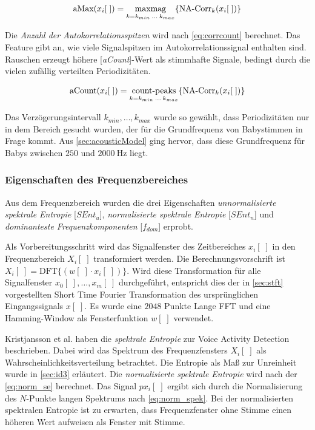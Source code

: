 \begin{equation}
\text{aMax}(x_i[\;]) = \operatorname*{max mag}_{k = k_{min} \: \ldots \: k_{max}}\{\text{NA-Corr}_k(x_i[\;])\}
\label{eq:corrpeak}
\end{equation}

Die \emph{Anzahl der Autokorrelationsspitzen} wird nach \autoref{eq:corrcount} berechnet. Das Feature gibt an, wie viele Signalspitzen im Autokorrelationssignal enthalten sind. Rauschen erzeugt höhere [\emph{aCount}]-Wert als stimmhafte Signale, bedingt durch die vielen zufällig verteilten Periodizitäten.\cite[S. 1 - 2]{vad_Lisboa}

\begin{equation}
\text{aCount}(x_i[\;]) = \operatorname*{count-peaks}_{k = k_{min} \: \ldots \: k_{max}}\{\text{NA-Corr}_k(x_i[\;])\}
\label{eq:corrcount}
\end{equation}

Das Verzögerungsintervall $k_{min} , \ldots , k_{max}$ wurde so gewählt, dass Periodizitäten nur in dem Bereich gesucht wurden, der für die Grundfrequenz von Babystimmen in Frage kommt. Aus \autoref{sec:acousticModel} ging hervor, dass diese Grundfrequenz für Babys zwischen $250$ und $\SI{2000}{\hertz}$ liegt.

\subsubsection{Eigenschaften des Frequenzbereiches}

Aus dem Frequenzbereich wurden die drei Eigenschaften \emph{unnormalisierte spektrale Entropie} [$SEnt_{u}$], \emph{normalisierte spektrale Entropie}  [$SEnt_{n}$] und \emph{dominanteste Frequenzkomponenten} [$f_{dom}$] erprobt.\cite{vad_Lisboa}

Als Vorbereitungsschritt wird das Signalfenster des Zeitbereiches $x_i[\;]$ in den Frequenzbereich $X_i[\;]$ transformiert werden. Die Berechnungsvorschrift ist $X_i[\;] = \text{DFT}\{(w[\;] \cdot x_i[\;])\}$. Wird diese Transformation für alle Signalfenster $x_0[\;], \ldots, x_m[\;]$ durchgeführt, entspricht dies der in \autoref{sec:stft} vorgestellten Short Time Fourier Transformation des ursprünglichen Eingangssignals $x[\;]$. Es wurde eine $2048$ Punkte Lange FFT und eine Hamming-Window als Fensterfunktion $w[\;]$ verwendet.

Kristjansson et al. \cite[S. 2]{vad_Lisboa} haben die \emph{spektrale Entropie} zur Voice Activity Detection beschrieben. Dabei wird das Spektrum des Frequenzfensters $X_i[\;]$ als Wahrscheinlichkeitsverteilung betrachtet. Die Entropie als Maß zur \glqq Unreinheit\grqq{} wurde in \autoref{sec:id3} erläutert. Die \emph{normalisierte spektrale Entropie} wird nach der \autoref{eq:norm_se} berechnet. Das Signal $px_i[\;]$ ergibt sich durch die Normalisierung des $N$-Punkte langen Spektrums nach \autoref{eq:norm_spek}. Bei der normalisierten spektralen Entropie ist zu erwarten, dass Frequenzfenster ohne Stimme einen höheren Wert aufweisen als Fenster mit Stimme. 


